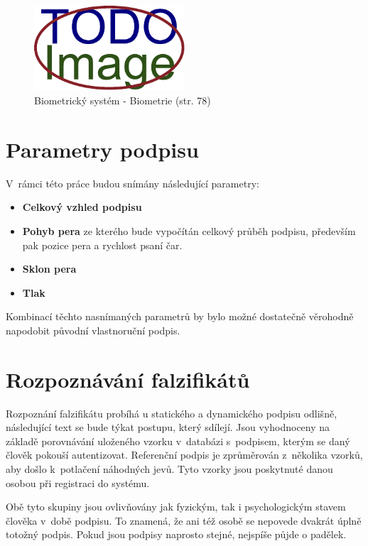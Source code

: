 \begin{figure}[h]
  \centering
  \includegraphics[width=0.5\textwidth]{obrazky-figures/placeholder.pdf}
  \caption{Biometrický systém - Biometrie (str. 78)}
  \label{fig:my-pdf}
\end{figure}

\section{Parametry podpisu}
V~rámci této práce budou snímány následující parametry:
\begin{itemize}
  \item{\textbf{Celkový vzhled podpisu}}
  \item{\textbf{Pohyb pera} ze kterého bude vypočítán celkový průběh podpisu, především pak pozice pera a rychlost psaní čar.} %
  \item{\textbf{Sklon pera}} %
  \item{\textbf{Tlak}} %
\end{itemize}
Kombinací těchto nasnímaných parametrů by bylo možné dostatečně věrohodně napodobit původní vlastnoruční podpis. 

\section{Rozpoznávání falzifikátů}
Rozpoznání falzifikátu probíhá u statického a dynamického podpisu odlišně, následující text se bude týkat postupu, který sdílejí.
Jsou vyhodnoceny na základě porovnávání uloženého vzorku v~databázi s~podpisem, kterým se daný člověk pokouší autentizovat.
Referenční podpis je zprůměrován z~několika vzorků, aby došlo k~potlačení náhodných jevů. %
Tyto vzorky jsou poskytnuté danou osobou při registraci do systému.

Obě tyto skupiny jsou ovlivňovány jak fyzickým, tak i psychologickým stavem člověka v~době podpisu.
To znamená, že ani též osobě se nepovede dvakrát úplně totožný podpis.
Pokud jsou podpisy naprosto stejné, nejspíše půjde o padělek.

